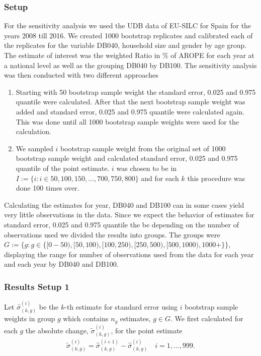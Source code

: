 \documentclass{scrartcl}\usepackage[]{graphicx}\usepackage[]{color}
\begin{document}
\subsubsection{Setup}
For the sensitivity analysis we used the UDB data of EU-SILC for Spain for the years 2008 till 2016. We created 1000 bootstrap replicates and calibrated each of the replicates for the variable DB040, household size and gender by age group. The estimate of interest was the weighted Ratio in $\%$ of AROPE for each year at a national level as well as the grouping DB040 by DB100. The sensitivity analysis was then conducted with two different approaches
\begin{enumerate}
  \item Starting with 50 bootstrap sample weight the standard error, 0.025 and 0.975 quantile were calculated. After that the next bootstrap sample weight was added and standard error, 0.025 and 0.975 quantile were calculated again. This was done until all 1000 bootstrap sample weights were used for the calculation.
  \item We sampled $i$ bootstrap sample weight from the original set of 1000 bootstrap sample weight and calculated standard error, 0.025 and 0.975 quantile of the point estimate. $i$ was chosen to be in $I:=\{i: i\in 50,100,150,\ldots,700,750,800\}$ and for each $k$ this procedure was done 100 times over.
\end{enumerate}

Calculating the estimates for year, DB040 and DB100 can in some cases yield very little observations in the data. Since we expect the behavior of estimates for standard error, 0.025 and 0.975 quantile the be depending on the number of observations used we divided the results into groups. The groups were $G:=\{g: g\in \{[0-50), [50,100), [100,250), [250,500), [500,1000), 1000+\}\}$, displaying the range for number of observations used from the data for each year and each year by DB040 and DB100.

\subsubsection{Results Setup 1}
Let $\hat{\sigma}^{(i)}_{(k,g)}$ be the $k$-th estimate for standard error using $i$ bootstrap sample weights in group $g$ which contains $n_g$ estimates, $g\in G$. We first calculated for each $g$ the absolute change, $\tilde{\sigma}^{(i)}_{(k,g)}$, for the point estimate
\begin{align*}
  \tilde{\sigma}^{(i)}_{(k,g)} = \hat{\sigma}^{(i+1)}_{(k,g)} - \hat{\sigma}^{(i)}_{(k,g)} \quad i=1,\ldots,999.
\end{align*}
\end{document}

